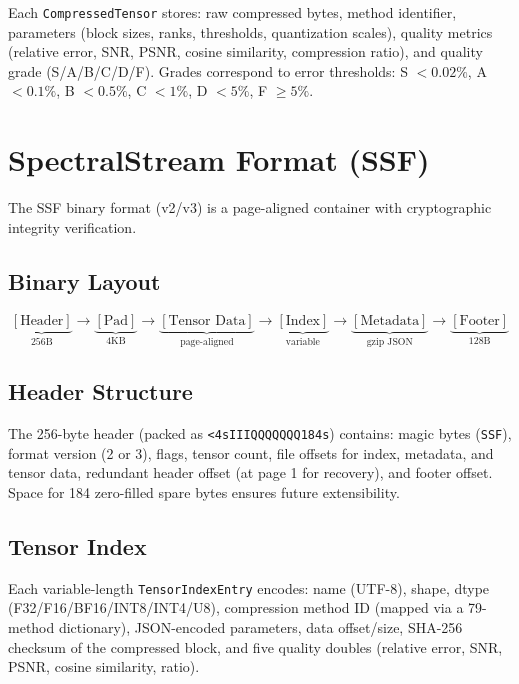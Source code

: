 \documentclass[11pt,a4paper,twocolumn]{article}
\begin{document}
Each \texttt{CompressedTensor} stores: raw compressed bytes, method identifier, parameters (block sizes, ranks, thresholds, quantization scales), quality metrics (relative error, SNR, PSNR, cosine similarity, compression ratio), and quality grade (S/A/B/C/D/F). Grades correspond to error thresholds: S $<0.02\%$, A $<0.1\%$, B $<0.5\%$, C $<1\%$, D $<5\%$, F $\ge5\%$.

\section{SpectralStream Format (SSF)}
\label{sec:format}

The SSF binary format (v2/v3) is a page-aligned container with cryptographic integrity verification.

\subsection{Binary Layout}

\begin{equation}
	\label{eq:layout}
	\underbrace{[\text{Header}]}_{256\text{B}} \to \underbrace{[\text{Pad}]}_{\text{4KB}} \to \underbrace{[\text{Tensor Data}]}_{\text{page-aligned}} \to \underbrace{[\text{Index}]}_{\text{variable}} \to \underbrace{[\text{Metadata}]}_{\text{gzip JSON}} \to \underbrace{[\text{Footer}]}_{128\text{B}}
\end{equation}

\subsection{Header Structure}
The 256-byte header (packed as \texttt{<4sIIIQQQQQQQ184s}) contains: magic bytes (\texttt{SSF}), format version (2 or 3), flags, tensor count, file offsets for index, metadata, and tensor data, redundant header offset (at page 1 for recovery), and footer offset. Space for 184 zero-filled spare bytes ensures future extensibility.

\subsection{Tensor Index}
Each variable-length \texttt{TensorIndexEntry} encodes: name (UTF-8), shape, dtype (F32/F16/BF16/INT8/INT4/U8), compression method ID (mapped via a 79-method dictionary), JSON-encoded parameters, data offset/size, SHA-256 checksum of the compressed block, and five quality doubles (relative error, SNR, PSNR, cosine similarity, ratio).
\end{document}
